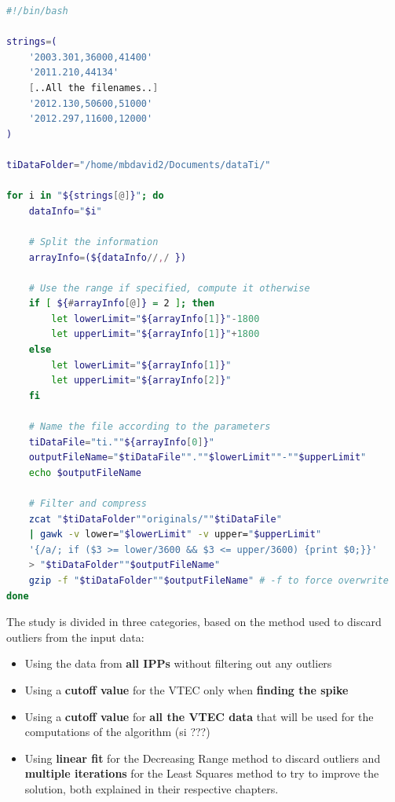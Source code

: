 \begin{minipage}{\linewidth}
	\begin{lstlisting}[language=Bash, caption=Filtering the ti file]
#!/bin/bash	
	
strings=(
	'2003.301,36000,41400'
	'2011.210,44134'
	[..All the filenames..] 
	'2012.130,50600,51000'
	'2012.297,11600,12000'
)

tiDataFolder="/home/mbdavid2/Documents/dataTi/"

for i in "${strings[@]}"; do
	dataInfo="$i"
	
	# Split the information
	arrayInfo=(${dataInfo//,/ })
	
	# Use the range if specified, compute it otherwise
	if [ ${#arrayInfo[@]} = 2 ]; then
		let lowerLimit="${arrayInfo[1]}"-1800
		let upperLimit="${arrayInfo[1]}"+1800
	else
		let lowerLimit="${arrayInfo[1]}"
		let upperLimit="${arrayInfo[2]}"
	fi
	
	# Name the file according to the parameters
	tiDataFile="ti.""${arrayInfo[0]}"
	outputFileName="$tiDataFile"".""$lowerLimit""-""$upperLimit"
	echo $outputFileName
	
	# Filter and compress
	zcat "$tiDataFolder""originals/""$tiDataFile" 
	| gawk -v lower="$lowerLimit" -v upper="$upperLimit" 
	'{/a/; if ($3 >= lower/3600 && $3 <= upper/3600) {print $0;}}' 
	> "$tiDataFolder""$outputFileName"
	gzip -f "$tiDataFolder""$outputFileName" # -f to force overwrite
done\end{lstlisting}
\end{minipage}

The study is divided in three categories, based on the method used to discard outliers from the input data:

\begin{itemize}
	\item Using the data from \textbf{all IPPs} without filtering out any outliers
	\item Using a \textbf{cutoff value} for the VTEC only when \textbf{finding the spike}
	\item Using a \textbf{cutoff value} for \textbf{all the VTEC data} that will be used for the computations of the algorithm (si ???)
	\item Using \textbf{linear fit} for the Decreasing Range method to discard outliers and \textbf{multiple iterations} for the Least Squares method to try to improve the solution, both explained in their respective chapters.
\end{itemize}

